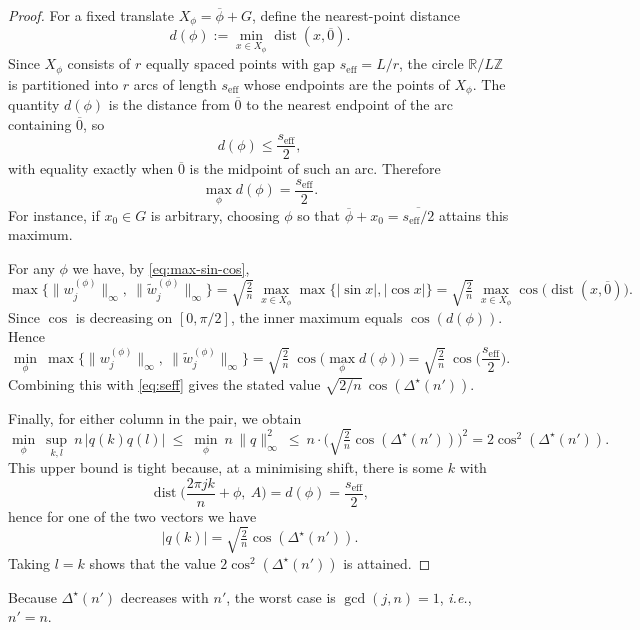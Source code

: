 \documentclass[12pt,fleqn]{amsart}
\renewcommand{\le}{\leqslant}
\theoremstyle{definition}
\theoremstyle{remark}
\newcommand{\1}{\mathbf{1}}
\begin{document}
\begin{proof}
For a fixed translate $X_\phi=\overline{\phi}+G$, define the nearest-point distance
\[
d(\phi):=\min_{x\in X_\phi}\operatorname{dist}(x,\overline{0}).
\]
Since $X_\phi$ consists of $r$ equally spaced points with gap $s_{\mathrm{eff}}=L/r$, the circle $\mathbb R/L\mathbb Z$ is partitioned into $r$ arcs of length $s_{\mathrm{eff}}$ whose endpoints are the points of $X_\phi$. The quantity $d(\phi)$ is the distance from $\overline{0}$ to the nearest endpoint of the arc containing $\overline{0}$, so
\[
d(\phi)\le \frac{s_{\mathrm{eff}}}{2},
\]
with equality exactly when $\overline{0}$ is the midpoint of such an arc. Therefore
\[
\max_{\phi} d(\phi)=\frac{s_{\mathrm{eff}}}{2}.
\]
For instance, if $x_0\in G$ is arbitrary, choosing $\phi$ so that $\overline{\phi}+x_0=\overline{s_{\mathrm{eff}}/2}$ attains this maximum.

\smallskip

For any $\phi$ we have, by \eqref{eq:max-sin-cos},
\[
\max\Big\{\|w^{(\phi)}_j\|_\infty,\ \|\tilde w^{(\phi)}_j\|_\infty\Big\}
=\sqrt{\tfrac{2}{n}}\ \max_{x\in X_\phi}\max\{|\sin x|,|\cos x|\}
=\sqrt{\tfrac{2}{n}}\ \max_{x\in X_\phi}\cos\big(\operatorname{dist}(x,\overline{0})\big).
\]
Since $\cos$ is decreasing on $[0,\pi/2]$, the inner maximum equals $\cos(d(\phi))$. Hence
\[
\min_{\phi}\ \max\Big\{\|w^{(\phi)}_j\|_\infty,\ \|\tilde w^{(\phi)}_j\|_\infty\Big\}
=\sqrt{\tfrac{2}{n}}\ \cos\!\Big(\max_{\phi} d(\phi)\Big)
=\sqrt{\tfrac{2}{n}}\ \cos\!\Big(\frac{s_{\mathrm{eff}}}{2}\Big).
\]
Combining this with \eqref{eq:seff} gives the stated value $\sqrt{2/n}\,\cos(\Delta^\star(n'))$.

Finally, for either column in the pair, we obtain
\[
\min_{\phi}\ \sup_{k,l}\ n\,|q(k)q(l)|
\ \le\ \min_{\phi}\ n\,\|q\|_\infty^2
\ \le\ n\cdot \Big(\sqrt{\tfrac{2}{n}}\cos(\Delta^\star(n'))\Big)^2
=2\cos^2(\Delta^\star(n')).
\]
This upper bound is tight because, at a minimising shift, there is some $k$ with
\[
\operatorname{dist}\!\Big(\frac{2\pi jk}{n}+\phi,\ A\Big)=d(\phi)=\frac{s_{\mathrm{eff}}}{2},
\]
hence for one of the two vectors we have
\[
|q(k)|=\sqrt{\tfrac{2}{n}}\cos(\Delta^\star(n')).
\]
Taking $l=k$ shows that the value $2\cos^2(\Delta^\star(n'))$ is attained.
\end{proof}


Because $\Delta^\star(n')$ decreases with $n'$, the worst case is $\gcd(j,n)=1$, \emph{i.e.},\ $n'=n$.
\end{document}
